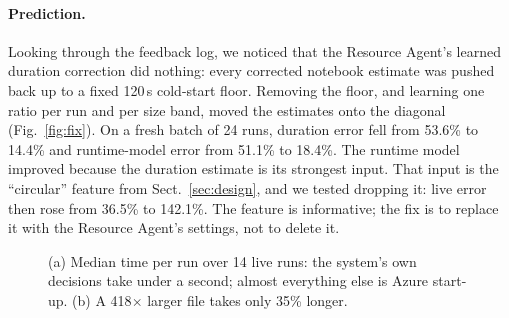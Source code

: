 \documentclass[runningheads]{llncs}
\begin{document}
\paragraph{Prediction.} Looking through the feedback log, we noticed that the Resource Agent's learned
duration correction did nothing: every corrected notebook estimate was pushed back up to a fixed
120\,s cold-start floor. Removing the floor, and learning one ratio per run and per size band, moved the
estimates onto the diagonal (Fig.~\ref{fig:fix}). On a fresh batch of 24 runs, duration error fell from
53.6\% to 14.4\% and runtime-model error from 51.1\% to 18.4\%. The runtime model improved because the
duration estimate is its strongest input. That input is the ``circular'' feature from Sect.~\ref{sec:design},
and we tested dropping it: live error then rose from 36.5\% to 142.1\%. The feature is informative; the
fix is to replace it with the Resource Agent's settings, not to delete it.

\begin{figure}[t]
\begin{minipage}[t]{0.49\linewidth}
\end{minipage}\hfill
\begin{minipage}[t]{0.49\linewidth}
\end{minipage}
\caption{(a) Median time per run over 14 live runs: the system's own decisions take under a second;
almost everything else is Azure start-up. (b) A 418$\times$ larger file takes only 35\% longer.}
\label{fig:time}
\end{figure}
\end{document}
